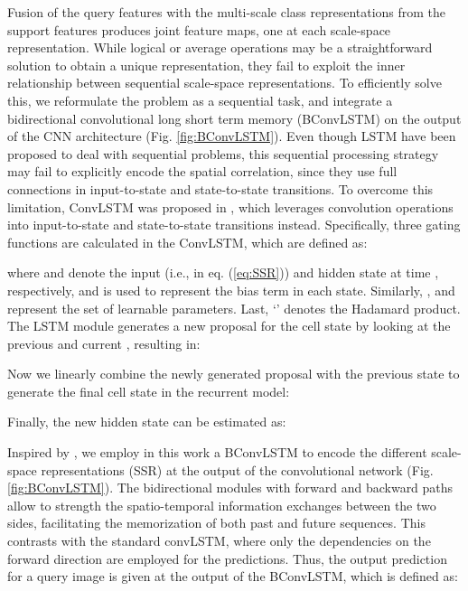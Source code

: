 \documentclass[runningheads]{llncs}
\begin{document}
Fusion of the query features  with the multi-scale class representations from the support features  produces  joint feature maps, one at each scale-space representation. While logical or average operations may be a straightforward solution to obtain a unique representation, they fail to exploit the inner relationship between sequential scale-space representations. To efficiently solve this, we reformulate the problem as a sequential task, and integrate a bidirectional convolutional long short term memory (BConvLSTM) \cite{Song_2018_ECCV} on the output of the CNN architecture (Fig. \ref{fig:BConvLSTM}). Even though LSTM have been proposed to deal with sequential problems, this sequential processing strategy may fail to explicitly encode the spatial correlation, since they use full connections in input-to-state and state-to-state transitions.
To overcome this limitation, ConvLSTM was proposed in \cite{xingjian2015convolutional}, which leverages convolution operations into input-to-state and state-to-state transitions instead. Specifically, three gating functions are calculated in the ConvLSTM, which are defined as:





where  and  denote the input (i.e.,  in eq. (\ref{eq:SSR})) and hidden state at time , respectively, and  is used to represent the bias term in each state. Similarly, ,  and  represent the set of learnable parameters. 
Last, `' denotes the Hadamard product.
The LSTM module generates a new proposal for the cell state by looking at the previous  and current , resulting in:

Now we linearly combine the newly generated proposal  with the previous state  to generate the final cell state in the recurrent model:

Finally, the new hidden state  can be estimated as:

Inspired by \cite{Song_2018_ECCV}, we employ in this work a BConvLSTM to encode the different scale-space representations (SSR) at the output of the convolutional network (Fig. \ref{fig:BConvLSTM}). The bidirectional modules with forward and backward paths allow to strength the spatio-temporal information exchanges between the two sides, facilitating the memorization of both past and future sequences. This contrasts with the standard convLSTM, where only the dependencies on the forward direction are employed for the predictions. Thus, the output prediction for a query image  is given at the output of the BConvLSTM, which is defined as:
\end{document}
